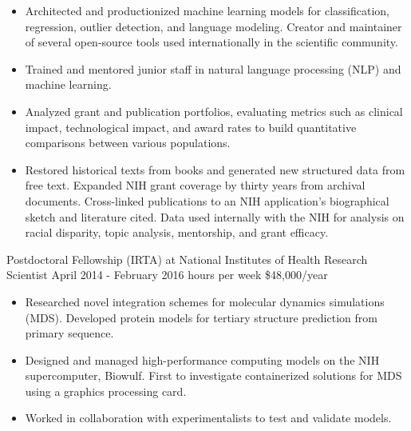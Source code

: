\documentclass[]{scrartcl}
\begin{document}
\begin{cleanCV}
{\begin{itemize}
    \item Architected and productionized machine learning models for classification, regression, outlier detection, and language modeling. Creator and maintainer of several open-source tools used internationally in the scientific community.

      \item Trained and mentored junior staff in natural language processing (NLP) and machine learning.
  
  \item Analyzed grant and publication portfolios, evaluating metrics such as clinical impact, technological impact, and award rates to build quantitative comparisons between various populations.
    
  \item Restored historical texts from books and generated new structured data from free text. Expanded NIH grant coverage by thirty years from archival documents. Cross-linked publications to an NIH application's biographical sketch and literature cited. Data used internally with the NIH for analysis on racial disparity, topic analysis, mentorship, and grant efficacy.    
    
  \end{itemize}
}

\vspace{0.5em}
 
\WorkExperience
{}
{Postdoctoral Fellowship (IRTA) at National Institutes of Health}
{\newline Research Scientist}
{
  \newline April 2014 - February 2016
   hours per week
  \newline \$48,000/year
}
{
  \begin{itemize}
  \item Researched novel integration schemes for molecular dynamics simulations (MDS). Developed protein models for tertiary structure prediction from primary sequence.

  \item Designed and managed high-performance computing models on the NIH supercomputer, Biowulf. First to investigate containerized solutions for MDS using a graphics processing card.

  \item Worked in collaboration with experimentalists to test and validate models. 

  \end{itemize}
}


\end{cleanCV}
\end{document}
